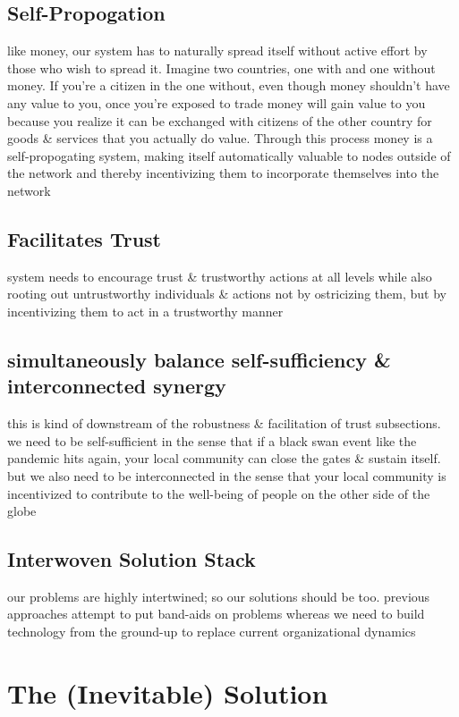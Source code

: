 \documentclass{article}
\begin{document}
\subsection{Self-Propogation}
like money, our system has to naturally spread itself without active effort by those who wish to spread it. Imagine two countries, one with and one without money. If you're a citizen in the one without, even though money shouldn't have any value to you, once you're exposed to trade money will gain value to you because you realize it can be exchanged with citizens of the other country for goods \& services that you actually do value. Through this process money is a self-propogating system, making itself automatically valuable to nodes outside of the network and thereby incentivizing them to incorporate themselves into the network

\subsection{Facilitates Trust}
system needs to encourage trust \& trustworthy actions at all levels while also rooting out untrustworthy individuals \& actions not by ostricizing them, but by incentivizing them to act in a trustworthy manner

\subsection{simultaneously balance self-sufficiency \& interconnected synergy}
this is kind of downstream of the robustness \& facilitation of trust subsections. we need to be self-sufficient in the sense that if a black swan event like the pandemic hits again, your local community can close the gates \& sustain itself. but we also need to be interconnected in the sense that your local community is incentivized to contribute to the well-being of people on the other side of the globe

\subsection{Interwoven Solution Stack}
our problems are highly intertwined; so our solutions should be too. previous approaches attempt to put band-aids on problems whereas we need to build technology from the ground-up to replace current organizational dynamics

\section{The (Inevitable) Solution}
\end{document}
